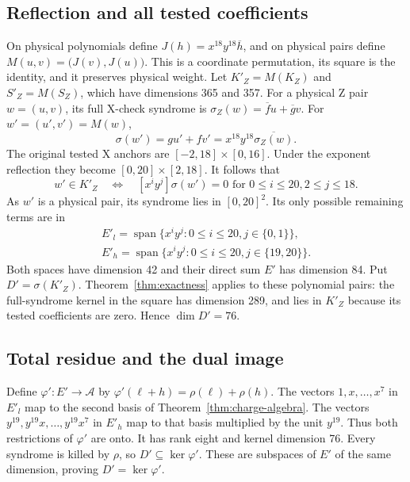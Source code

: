 \documentclass{article}
\DeclareMathOperator{\Span}{span}
\begin{document}
\subsection{Reflection and all tested coefficients}\label{sec:z-reflection}

On physical polynomials define \(J(h) = x^{18} y^{18} \overline{h}\), and on physical pairs
define \(M(u,v) = \bigl(J(v), J(u)\bigr)\). This is a coordinate permutation, its square is
the identity, and it preserves physical weight. Let \(K'_Z = M(K_Z)\) and
\(S'_Z = M(S_Z)\), which have dimensions 365 and 357. For a physical Z pair \(w = (u,v)\),
its full X-check syndrome is \(\sigma_Z(w) = \overline{f} u + \overline{g} v\). For
\(w' = (u', v') = M(w)\),
\begin{equation}
  \sigma(w') = g u' + f v' = x^{18} y^{18} \overline{\sigma_Z(w)}.
\end{equation}
The original tested X anchors are \([-2,18] \times [0,16]\). Under the exponent reflection
they become \([0,20] \times [2,18]\). It follows that
\begin{equation}
  w' \in K'_Z \quad \Longleftrightarrow \quad
  [x^i y^j]\sigma(w') = 0
  \text{ for } 0 \le i \le 20, 2 \le j \le 18.
\end{equation}
As \(w'\) is a physical pair, its syndrome lies in \([0,20]^2\). Its only possible remaining
terms are in
\begin{gather}
  E'_l = \Span\{x^i y^j : 0 \le i \le 20, j \in \{0,1\}\}, \\
  E'_h = \Span\{x^i y^j : 0 \le i \le 20, j \in \{19,20\}\}.
\end{gather}
Both spaces have dimension 42 and their direct sum \(E'\) has dimension 84. Put
\(D' = \sigma(K'_Z)\). Theorem~\ref{thm:exactness} applies to these polynomial pairs: the
full-syndrome kernel in the square has dimension 289, and lies in \(K'_Z\) because its tested
coefficients are zero. Hence \(\dim D' = 76\).

\subsection{Total residue and the dual image}\label{sec:z-residue}

Define \(\varphi' \colon E' \to \mathcal{A}\) by
\(\varphi'(\ell + h) = \rho(\ell) + \rho(h)\). The vectors \(1, x, \dots, x^7\) in \(E'_l\)
map to the second basis of Theorem~\ref{thm:charge-algebra}. The vectors
\(y^{19}, y^{19} x, \dots, y^{19} x^7\) in \(E'_h\) map to that basis multiplied by the unit
\(y^{19}\). Thus both restrictions of \(\varphi'\) are onto. It has rank eight and kernel
dimension 76. Every syndrome is killed by \(\rho\), so \(D' \subseteq \ker \varphi'\). These
are subspaces of \(E'\) of the same dimension, proving \(D' = \ker \varphi'\).
\end{document}
